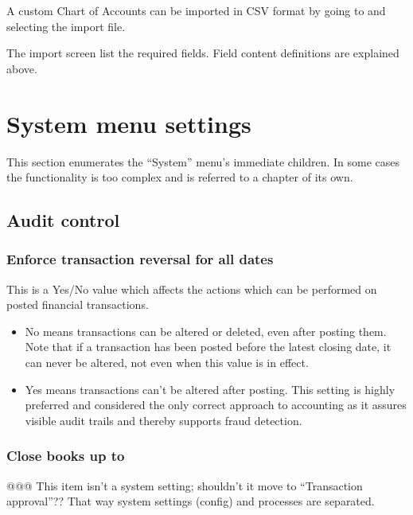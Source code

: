 A custom Chart of Accounts can be imported in CSV format by going to  and selecting the import file.

The import screen list the required fields. Field content definitions are explained above.

\section{System menu settings}
\label{sec-company-config-system-menu}

This section enumerates the ``System'' menu's immediate children. In some cases the
functionality is too complex and is referred to a chapter of its own.

\subsection{Audit control}
\label{subsec-company-config-audit-control}

\subsubsection{Enforce transaction reversal for all dates}
\label{subsubsec-company-config-audit-control-reversals}


This is a Yes/No value which affects the actions which can be performed on posted financial transactions.
\begin{itemize}
\item No means transactions can be altered or deleted, even after posting them. Note that
if a transaction has been posted before the latest closing date, it can never be altered,
not even when this value is in effect.
\item Yes means transactions can't be altered after posting. This setting is highly preferred and considered the only correct approach to accounting as it assures visible
audit trails and thereby supports fraud detection.
\end{itemize}

\subsubsection{Close books up to}
\label{subsubsec-company-config-audit-control-close-books}


@@@ This item isn't a system setting; shouldn't it move to ``Transaction approval''?? That way system settings (config) and processes are separated.

